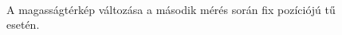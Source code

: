 \begin{figure}[!hp]
\begin{center}
		\\
		\caption{A magasságtérkép változása a második mérés során fix pozíciójú tű esetén.}
		\label{fig:terkep_anim}
		\end{center}
	\end{figure}